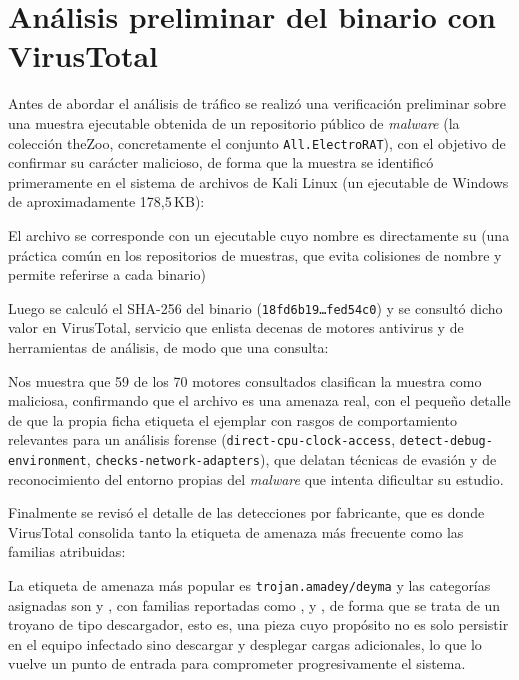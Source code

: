 \section{Análisis preliminar del binario con VirusTotal}

Antes de abordar el análisis de tráfico se realizó una verificación preliminar sobre una muestra ejecutable obtenida de un repositorio público de \emph{malware} (la colección theZoo, concretamente el conjunto \texttt{All.ElectroRAT}), con el objetivo de confirmar su carácter malicioso, de forma que la muestra se identificó primeramente en el sistema de archivos de Kali Linux (un ejecutable de Windows de aproximadamente 178,5\,KB):


\begin{analisis}
El archivo se corresponde con un ejecutable cuyo nombre es directamente su  (una práctica común en los repositorios de muestras, que evita colisiones de nombre y permite referirse a cada binario)
\end{analisis}

Luego se calculó el  SHA-256 del binario (\texttt{18fd6b19\dots fed54c0}) y se consultó dicho valor en VirusTotal, servicio que enlista decenas de motores antivirus y de herramientas de análisis, de modo que una consulta:


\begin{analisis}
Nos muestra que 59 de los 70 motores consultados clasifican la muestra como maliciosa, confirmando que el archivo es una amenaza real, con el pequeño detalle de que la propia ficha etiqueta el ejemplar con rasgos de comportamiento relevantes para un análisis forense (\texttt{direct-cpu-clock-access}, \texttt{detect-debug-environment}, \texttt{checks-network-adapters}), que delatan técnicas de evasión y de reconocimiento del entorno propias del \emph{malware} que intenta dificultar su estudio.
\end{analisis}

Finalmente se revisó el detalle de las detecciones por fabricante, que es donde VirusTotal consolida tanto la etiqueta de amenaza más frecuente como las familias atribuidas:


\begin{analisis}
La etiqueta de amenaza más popular es \texttt{trojan.amadey/deyma} y las categorías asignadas son  y , con familias reportadas como ,  y , de forma que se trata de un troyano de tipo descargador, esto es, una pieza cuyo propósito no es solo persistir en el equipo infectado sino descargar y desplegar cargas adicionales, lo que lo vuelve un punto de entrada para comprometer progresivamente el sistema. 
\end{analisis}
